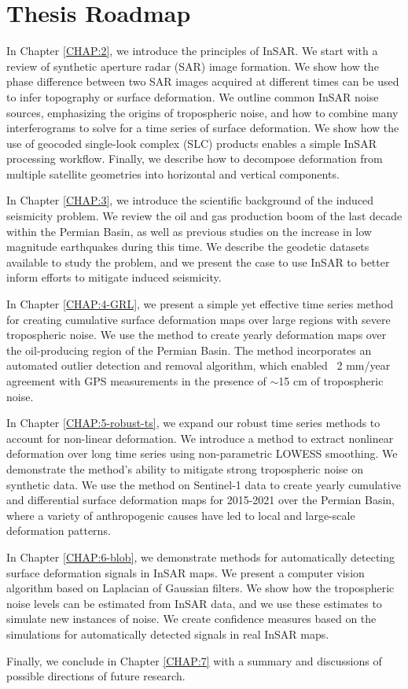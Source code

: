 \section{Thesis Roadmap}
\label{sec:chap1-roadmap}


In Chapter \ref{CHAP:2}, we introduce the principles of InSAR. We start with a review of synthetic aperture radar (SAR) image formation. We show how the phase difference between two SAR images acquired at different times can be used to infer topography or surface deformation. We outline common InSAR noise sources, emphasizing the origins of tropospheric noise, and how to combine many interferograms to solve for a time series of surface deformation. We show how the use of geocoded single-look complex (SLC) products enables a simple InSAR processing workflow. Finally, we describe how to decompose deformation from multiple satellite geometries into horizontal and vertical components.


In Chapter \ref{CHAP:3}, we introduce the scientific background of the induced seismicity problem. We review the oil and gas production boom of the last decade within the Permian Basin, as well as previous studies on the increase in low magnitude earthquakes during this time. We describe the geodetic datasets available to study the problem, and we present the case to use InSAR 
to better inform efforts to mitigate induced seismicity.


In Chapter \ref{CHAP:4-GRL}, we present a simple yet effective time series method for creating cumulative surface deformation maps over large regions with severe tropospheric noise. We use the method to create yearly deformation maps over the oil-producing region of the Permian Basin. The method incorporates an automated outlier detection and removal algorithm, which enabled ~2 mm/year agreement with GPS measurements in the presence of $\sim$15 cm of tropospheric noise.


In Chapter \ref{CHAP:5-robust-ts}, we expand our robust time series methods to account for non-linear deformation. We introduce a method to extract nonlinear deformation over long time series using non-parametric LOWESS smoothing. We demonstrate the method's ability to mitigate strong tropospheric noise on synthetic data. We use the method on Sentinel-1 data to create yearly cumulative and differential surface deformation maps for 2015-2021 over the Permian Basin, where a variety of anthropogenic causes have led to local and large-scale deformation patterns.


In Chapter \ref{CHAP:6-blob}, we demonstrate methods for automatically detecting surface deformation signals in InSAR maps. We present a computer vision algorithm based on Laplacian of Gaussian filters. We show how the tropospheric noise levels can be estimated from InSAR data, and we use these estimates to simulate new instances of noise. We create confidence measures based on the simulations for automatically detected signals in real InSAR maps.


Finally, we conclude in Chapter \ref{CHAP:7} with a summary and discussions of possible directions of future research.
